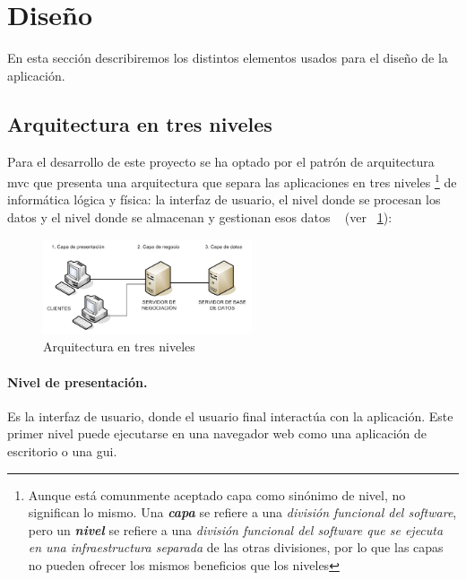 \section{Diseño}
\label{sec:disenho}

En esta sección describiremos los distintos elementos usados para el diseño de la aplicación.


\subsection{Arquitectura en tres niveles}
\label{sub:arquitectura3niveles}

Para el desarrollo de este proyecto se ha optado por el patrón de arquitectura \acrlong{mvc} que presenta una arquitectura que separa las aplicaciones en tres niveles \footnote{Aunque está comunmente aceptado capa como sinónimo de nivel, no significan lo mismo. Una \textit{\textbf{capa}} se refiere a una \textit{división funcional del software}, pero un \textit{\textbf{nivel}} se refiere a una \textit{división funcional del software que se ejecuta en una infraestructura separada}  de las otras divisiones, por lo que las capas no pueden ofrecer los mismos beneficios que los niveles} de informática lógica y física: la interfaz de usuario, el nivel donde se procesan los datos y el nivel donde se almacenan y gestionan esos datos ~\cite{ibmMVC} (ver \figurename~\ref{fig:arquitectura-3-niveles}):

\begin{figure}
  \centering
  \includegraphics[width=0.55\textwidth]{imaxes/arquitectura-3-niveles.png}
  \caption{Arquitectura en tres niveles}
  \label{fig:arquitectura-3-niveles}
\end{figure}

\paragraph{Nivel de presentación.} Es la interfaz de usuario, donde el usuario final interactúa con la aplicación. Este primer nivel puede ejecutarse en una navegador web como una aplicación de escritorio o una \acrshort{gui}.

